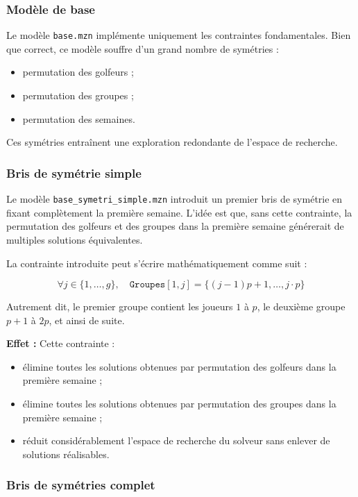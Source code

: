 \documentclass{article}
\begin{document}
\subsubsection{Modèle de base}

Le modèle \texttt{base.mzn} implémente uniquement les contraintes fondamentales.
Bien que correct, ce modèle souffre d’un grand nombre de symétries :
\begin{itemize}
    \item permutation des golfeurs ;
    \item permutation des groupes ;
    \item permutation des semaines.
\end{itemize}

Ces symétries entraînent une exploration redondante de l’espace de recherche.

\subsubsection{Bris de symétrie simple}

Le modèle \texttt{base\_symetri\_simple.mzn} introduit un premier bris de symétrie en fixant complètement la première semaine.  
L’idée est que, sans cette contrainte, la permutation des golfeurs et des groupes dans la première semaine générerait de multiples solutions équivalentes.

La contrainte introduite peut s’écrire mathématiquement comme suit :

\[
\forall j \in \{1, \dots, g\}, \quad
\texttt{Groupes}[1,j] = \{ (j-1)p + 1, \dots, j \cdot p \}
\]

Autrement dit, le premier groupe contient les joueurs $1$ à $p$, le deuxième groupe $p+1$ à $2p$, et ainsi de suite.  

\noindent
\textbf{Effet :} Cette contrainte :
\begin{itemize}
    \item élimine toutes les solutions obtenues par permutation des golfeurs dans la première semaine ;
    \item élimine toutes les solutions obtenues par permutation des groupes dans la première semaine ;
    \item réduit considérablement l’espace de recherche du solveur sans enlever de solutions réalisables.
\end{itemize}



\subsubsection{Bris de symétries complet}
\end{document}
